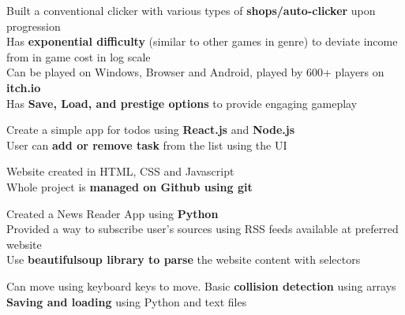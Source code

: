 \documentclass[]{Nikhil_Kadiyan_Resume}
\begin{document}
\pt Built a conventional clicker with various types of \textbf{shops/auto-clicker} upon progression \\
\pt Has \textbf{exponential difficulty} (similar to other games in genre) to deviate income from in game cost in log scale \\
\pt Can be played on Windows, Browser and Android, played by 600+ players on \textbf{itch.io}\\
\pt Has \textbf{Save, Load, and prestige options} to provide engaging gameplay\\
\sectionsep

\pt Create a simple app for todos using \textbf{React.js} and \textbf{Node.js} \\
\pt User can \textbf{add or remove task} from the list using the UI
\sectionsep

\pt Website created in HTML, CSS and Javascript\\
\pt Whole project is \textbf{managed on Github using git} \\
\sectionsep

\pt Created a News Reader App using \textbf{Python} \\
\pt Provided a way to subscribe user's sources using RSS feeds available at preferred website \\
\pt Use \textbf{beautifulsoup library to parse} the website content with selectors \\
\sectionsep

\pt Can move using keyboard keys to move. Basic \textbf{collision detection} using arrays \\
\pt \textbf{Saving and loading} using Python and text files \\
\sectionsep

\end{document}
